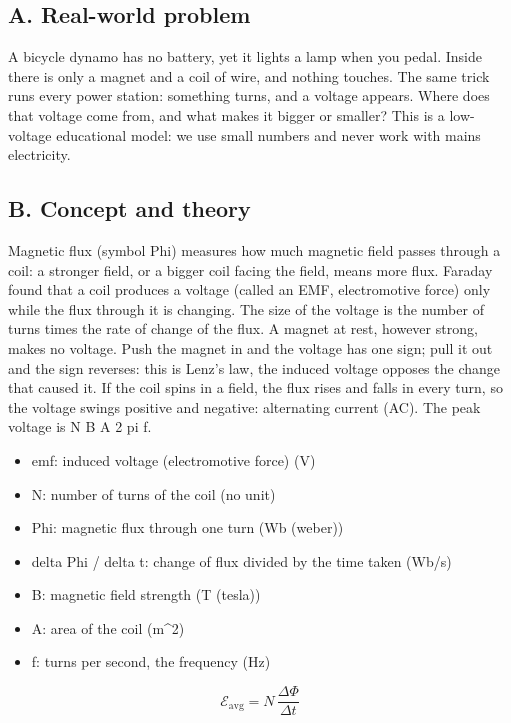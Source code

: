 \documentclass[11pt,a4paper]{article}
\begin{document}
\subsection*{A. Real-world problem}
A bicycle dynamo has no battery, yet it lights a lamp when you pedal. Inside there is only a magnet and a coil of wire, and nothing touches. The same trick runs every power station: something turns, and a voltage appears. Where does that voltage come from, and what makes it bigger or smaller? This is a low-voltage educational model: we use small numbers and never work with mains electricity.

\subsection*{B. Concept and theory}
Magnetic flux (symbol Phi) measures how much magnetic field passes through a coil: a stronger field, or a bigger coil facing the field, means more flux. Faraday found that a coil produces a voltage (called an EMF, electromotive force) only while the flux through it is changing. The size of the voltage is the number of turns times the rate of change of the flux. A magnet at rest, however strong, makes no voltage. Push the magnet in and the voltage has one sign; pull it out and the sign reverses: this is Lenz's law, the induced voltage opposes the change that caused it. If the coil spins in a field, the flux rises and falls in every turn, so the voltage swings positive and negative: alternating current (AC). The peak voltage is N B A 2 pi f.

\begin{itemize}[nosep]
\item emf: induced voltage (electromotive force) (V)
\item N: number of turns of the coil (no unit)
\item Phi: magnetic flux through one turn (Wb (weber))
\item delta Phi / delta t: change of flux divided by the time taken (Wb/s)
\item B: magnetic field strength (T (tesla))
\item A: area of the coil (m\textasciicircum{}2)
\item f: turns per second, the frequency (Hz)
\end{itemize}

\begin{equation*}
\mathcal{E}_{\mathrm{avg}} = N\,\frac{\Delta\Phi}{\Delta t}
\end{equation*}
\end{document}
